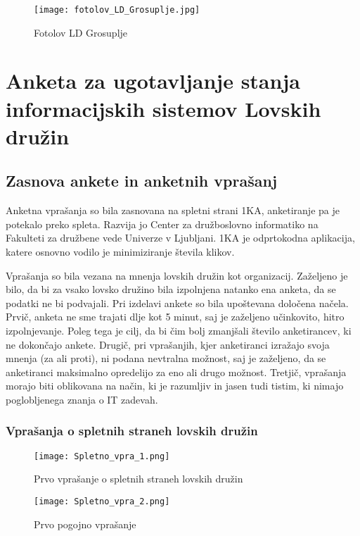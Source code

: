 \documentclass[a4paper,12pt,openright]{book}
\begin{document}
\begin{figure}[h!]
    \centering
    \texttt{[image: fotolov\_LD\_Grosuplje.jpg]}
    \caption{Fotolov LD Grosuplje \cite{LD_Grosuplje_fotolov}}
    \label{fig:ld_grosuplje}
\end{figure}




\chapter{Anketa za ugotavljanje stanja informacijskih sistemov Lovskih družin}
\label{anketa}

\section{Zasnova ankete in anketnih vprašanj}

Anketna vprašanja so bila zasnovana na spletni strani 1KA, anketiranje pa je potekalo preko spleta.
Razvija jo Center za družboslovno informatiko na Fakulteti za družbene vede Univerze v Ljubljani.
1KA je odprtokodna aplikacija, katere osnovno vodilo je minimiziranje števila klikov. \cite{1ka}

Vprašanja so bila vezana na mnenja lovskih družin kot organizacij.
Zaželjeno je bilo, da bi za vsako lovsko družino bila izpolnjena natanko ena anketa, da se podatki ne bi podvajali.
Pri izdelavi ankete so bila upoštevana določena načela.
Prvič, anketa ne sme trajati dlje kot 5 minut, saj je zaželjeno učinkovito, hitro izpolnjevanje.
Poleg tega je cilj, da bi čim bolj zmanjšali število anketirancev, ki ne dokončajo ankete.
Drugič, pri vprašanjih, kjer anketiranci izražajo svoja mnenja (za ali proti), ni podana nevtralna možnost, saj je zaželjeno, da se anketiranci maksimalno opredelijo za eno ali drugo možnost.
Tretjič, vprašanja morajo biti oblikovana na način, ki je razumljiv in jasen tudi tistim, ki nimajo poglobljenega znanja o IT zadevah.

\subsection{Vprašanja o spletnih straneh lovskih družin}

\begin{figure}[h!]  
  \centering
  \begin{minipage}[b]{0.7\textwidth}  
    \centering
    \texttt{[image: Spletno\_vpra\_1.png]}
    \caption{Prvo vprašanje o spletnih straneh lovskih družin}
    \label{fig:spletno_vpra_1}
  \end{minipage}
  
  \vspace{0.5cm} %
  
  \begin{minipage}[b]{0.8\textwidth} 
    \centering
    \texttt{[image: Spletno\_vpra\_2.png]}
    \caption{Prvo pogojno vprašanje}
    \label{fig:spletno_vpra_2}
  \end{minipage}
\end{figure}
\end{document}
